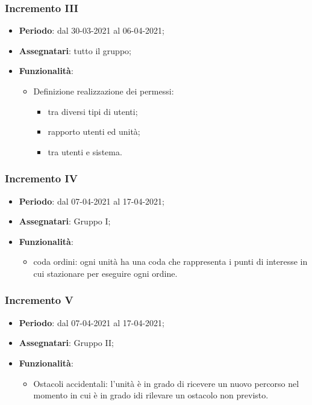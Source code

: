 \subsubsection{Incremento III}
\begin{itemize}
	\item \textbf{Periodo}: dal 30-03-2021 al 06-04-2021;
	\item \textbf{Assegnatari}: tutto il gruppo;
	\item \textbf{Funzionalità}:
	\begin{itemize}
		\item Definizione  realizzazione dei permessi:
		\begin{itemize}
			\item tra diversi tipi di utenti;
			\item rapporto utenti ed unità;
			\item tra utenti e sistema.
		\end{itemize}
	\end{itemize}	
\end{itemize}


 \subsubsection{Incremento IV}
\begin{itemize}
	\item \textbf{Periodo}: dal 07-04-2021 al 17-04-2021;
	\item \textbf{Assegnatari}: Gruppo I;
	\item \textbf{Funzionalità}:
	\begin{itemize}
	\item coda ordini: ogni unità ha una coda che rappresenta i punti di interesse in cui stazionare per eseguire ogni ordine.	
	\end{itemize}	
\end{itemize}
 
 \subsubsection{Incremento V}
\begin{itemize}
	\item \textbf{Periodo}: dal 07-04-2021 al 17-04-2021;
	\item \textbf{Assegnatari}: Gruppo II;
	\item \textbf{Funzionalità}:
	\begin{itemize}
		\item Ostacoli accidentali: l'unità è in grado di ricevere un nuovo percorso nel momento in cui è in grado idi rilevare un ostacolo non previsto.		
	\end{itemize}	
\end{itemize}	
